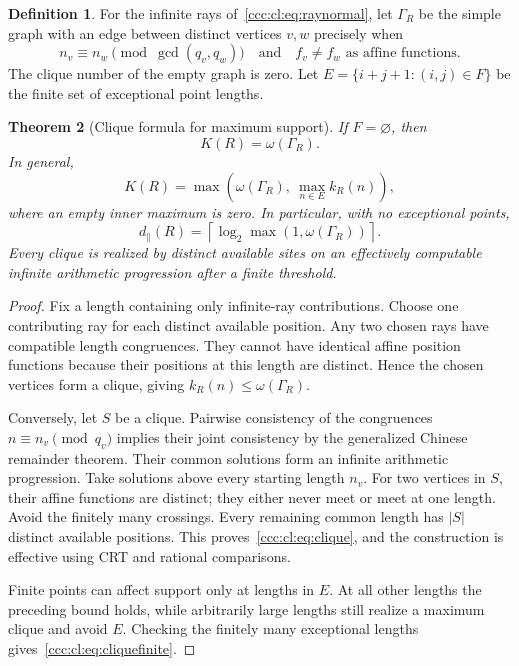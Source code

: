 \documentclass[11pt,letterpaper]{article}
\newtheorem{theorem}{Theorem}[section]
\theoremstyle{definition}
\newtheorem{definition}[theorem]{Definition}
\theoremstyle{remark}
\newcommand{\clog}[1]{\left\lceil\log_2 #1\right\rceil}
\begin{document}
\begin{definition}
For the infinite rays of~\eqref{ccc:cl:eq:raynormal}, let $\Gamma_R$ be the
simple graph with an edge between distinct vertices $v,w$ precisely when
\begin{equation}\label{ccc:cl:eq:graphedge}
 n_v\equiv n_w\pmod{\gcd(q_v,q_w)}
 \quad\text{and}\quad f_v\ne f_w
 \text{ as affine functions}.
\end{equation}
The clique number of the empty graph is zero. Let
$E=\{i+j+1:(i,j)\in F\}$ be the finite set of exceptional point lengths.
\end{definition}

\begin{theorem}[Clique formula for maximum support]\label{ccc:cl:thm:clique}
If $F=\varnothing$, then
\begin{equation}\label{ccc:cl:eq:clique}
 K(R)=\omega(\Gamma_R).
\end{equation}
In general,
\begin{equation}\label{ccc:cl:eq:cliquefinite}
 K(R)=\max\left(\omega(\Gamma_R),\ \max_{n\in E}k_R(n)\right),
\end{equation}
where an empty inner maximum is zero. In particular, with no exceptional
points,
\[
 d_{\parallel}(R)=\clog{\max(1,\omega(\Gamma_R))}.
\]
Every clique is realized by distinct available sites on an effectively
computable infinite arithmetic progression after a finite threshold.
\end{theorem}
\begin{proof}
Fix a length containing only infinite-ray contributions. Choose one
contributing ray for each distinct available position. Any two chosen
rays have compatible length congruences. They cannot have identical
affine position functions because their positions at this length are
distinct. Hence the chosen vertices form a clique, giving
$k_R(n)\le\omega(\Gamma_R)$.

Conversely, let $S$ be a clique. Pairwise consistency of the congruences
$n\equiv n_v\pmod{q_v}$ implies their joint consistency by the
generalized Chinese remainder theorem. Their common solutions form an
infinite arithmetic progression. Take solutions above every starting
length $n_v$. For two vertices in $S$, their affine functions are distinct;
they either never meet or meet at one length. Avoid the finitely many
crossings. Every remaining common length has $|S|$ distinct available
positions. This proves~\eqref{ccc:cl:eq:clique}, and the construction is
effective using CRT and rational comparisons.

Finite points can affect support only at lengths in $E$. At all other
lengths the preceding bound holds, while arbitrarily large lengths still
realize a maximum clique and avoid $E$. Checking the finitely many
exceptional lengths gives~\eqref{ccc:cl:eq:cliquefinite}.
\end{proof}
\end{document}

